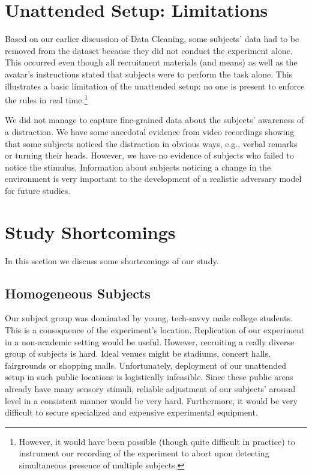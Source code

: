 \documentclass{llncs}
\begin{document}
\section{Unattended Setup: Limitations}
\label{sec:lessons}
%
Based on our earlier discussion of Data Cleaning,  some subjects' data had to be removed 
from the dataset because they did not conduct the experiment alone.
This occurred even though all recruitment materials (and means)  as well as the avatar's
instructions stated that subjects were to perform the task alone. This illustrates a basic limitation 
of the unattended setup: no one is present to enforce the rules in real time.\footnote{However, 
it would have been possible (though quite difficult in practice) to instrument our recording of the experiment to abort upon 
detecting simultaneous presence of multiple subjects.} 

We did not manage to capture fine-grained data about the subjects' awareness of a distraction. 
We have some anecdotal evidence from video recordings showing that some subjects noticed 
the distraction in obvious ways, e.g., verbal remarks or turning their heads. However, we have no
evidence of subjects who failed to notice the stimulus. Information about subjects noticing
a change in the environment is very important to the development of a realistic adversary model 
for future studies.


\section{Study Shortcomings}
\label{sec:limits}
%
In this section we discuss some shortcomings of our study.

\subsection{Homogeneous Subjects}
%
Our subject group was dominated by young, tech-savvy male college students. 
This is a consequence of the experiment's location. Replication of our 
experiment in a non-academic setting would be useful. However, recruiting a really diverse group of 
subjects is hard. Ideal venues might be stadiums, concert halls, fairgrounds or shopping malls. 
Unfortunately, deployment of our unattended setup in such public locations is logistically infeasible. 
Since these public areas already have many sensory stimuli, reliable adjustment of our 
subjects' arousal level in a consistent manner would be very hard. Furthermore, it would be
very difficult to secure specialized and expensive experimental equipment.
\end{document}
